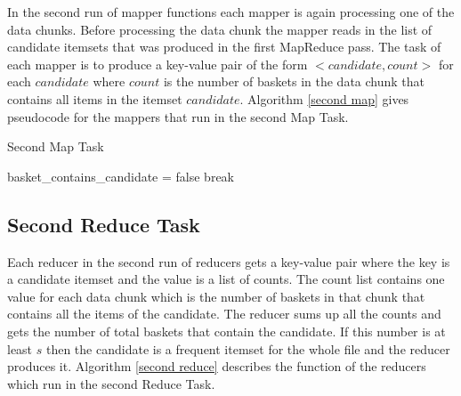 In the second run of mapper functions each mapper is again processing one of the data chunks. Before processing the data chunk the mapper reads in the list of candidate itemsets that was produced in the first MapReduce pass. The task of each mapper is to produce a key-value pair of the form $<candidate, count>$ for each $candidate$ where $count$ is the number of baskets in the data chunk that contains all items in the itemset $candidate$. Algorithm \ref{second map} gives pseudocode for the mappers that run in the second Map Task.
\begin{algorithm}
  \caption{Second Map Task}\label{second map}
  \begin{algorithmic}[1]
            		\State basket\_contains\_candidate = false
            		\State break
            	\EndIf
            \EndFor
            \EndIf
            \EndFor
       \EndFor
       
        \EndFor
      
    \EndFunction
\end{algorithmic}
\end{algorithm}

\subsection{Second Reduce Task}\label{second reduce task}
Each reducer in the second run of reducers gets a key-value pair where the key is a candidate itemset and the value is a list of counts. The count list contains one value for each data chunk which is the number of baskets in that chunk that contains all the items of the candidate. The reducer sums up all the counts and gets the number of total baskets that contain the candidate. If this number is at least $s$ then the candidate is a frequent itemset for the whole file and the reducer produces it. Algorithm \ref{second reduce} describes the function of the reducers which run in the second Reduce Task.

